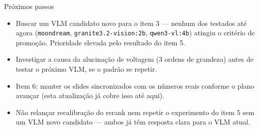 \documentclass{beamer}
\begin{document}
\begin{frame}{Próximos passos}
  \begin{itemize}
    \item Buscar um VLM candidato novo para o item 3 — nenhum dos testados até agora
      (\texttt{moondream}, \texttt{granite3.2-vision:2b}, \texttt{qwen3-vl:4b}) atingiu
      o critério de promoção. Prioridade elevada pelo resultado do item 5.
    \item Investigar a causa da alucinação de voltagem (3 ordens de grandeza) antes de
      testar o próximo VLM, se o padrão se repetir.
    \item Item 6: manter os slides sincronizados com os números reais conforme o plano
      avançar (esta atualização já cobre isso até aqui).
    \item Não relançar recalibração do rerank nem repetir o experimento do item 5 sem um
      VLM novo candidato — ambos já têm resposta clara para o VLM atual.
  \end{itemize}
\end{frame}
\end{document}
